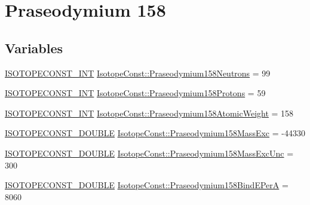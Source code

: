 \hypertarget{group___isotope_const-_praseodymium-_pr158}{}\section{Praseodymium 158}
\label{group___isotope_const-_praseodymium-_pr158}
\subsection*{Variables}
\begin{DoxyCompactItemize}
\item 
\mbox{\hyperlink{group___isotope_const-_macros_ga5f18360b3e99483a35c32d789e62621c}{I\+S\+O\+T\+O\+P\+E\+C\+O\+N\+S\+T\+\_\+\+I\+NT}} \mbox{\hyperlink{group___isotope_const-_praseodymium-_pr158_ga1643f275dcd857b2c5a684f2f9e751f9}{Isotope\+Const\+::\+Praseodymium158\+Neutrons}} = 99
\item 
\mbox{\hyperlink{group___isotope_const-_macros_ga5f18360b3e99483a35c32d789e62621c}{I\+S\+O\+T\+O\+P\+E\+C\+O\+N\+S\+T\+\_\+\+I\+NT}} \mbox{\hyperlink{group___isotope_const-_praseodymium-_pr158_gaf6fe8dbd43e0128d3000883e8921eedd}{Isotope\+Const\+::\+Praseodymium158\+Protons}} = 59
\item 
\mbox{\hyperlink{group___isotope_const-_macros_ga5f18360b3e99483a35c32d789e62621c}{I\+S\+O\+T\+O\+P\+E\+C\+O\+N\+S\+T\+\_\+\+I\+NT}} \mbox{\hyperlink{group___isotope_const-_praseodymium-_pr158_gad89468ec95b27f1875fb2e4d13703aa6}{Isotope\+Const\+::\+Praseodymium158\+Atomic\+Weight}} = 158
\item 
\mbox{\hyperlink{group___isotope_const-_macros_ga8f45a7272ce02c0b4c65c44636ed719a}{I\+S\+O\+T\+O\+P\+E\+C\+O\+N\+S\+T\+\_\+\+D\+O\+U\+B\+LE}} \mbox{\hyperlink{group___isotope_const-_praseodymium-_pr158_ga8a83a7607b4c80c02d9fededa6e7cf62}{Isotope\+Const\+::\+Praseodymium158\+Mass\+Exc}} = -\/44330
\item 
\mbox{\hyperlink{group___isotope_const-_macros_ga8f45a7272ce02c0b4c65c44636ed719a}{I\+S\+O\+T\+O\+P\+E\+C\+O\+N\+S\+T\+\_\+\+D\+O\+U\+B\+LE}} \mbox{\hyperlink{group___isotope_const-_praseodymium-_pr158_gafc1a418cbf7eb8d79c97c4029f903be5}{Isotope\+Const\+::\+Praseodymium158\+Mass\+Exc\+Unc}} = 300
\item 
\mbox{\hyperlink{group___isotope_const-_macros_ga8f45a7272ce02c0b4c65c44636ed719a}{I\+S\+O\+T\+O\+P\+E\+C\+O\+N\+S\+T\+\_\+\+D\+O\+U\+B\+LE}} \mbox{\hyperlink{group___isotope_const-_praseodymium-_pr158_ga3a7508f0f6b46cd64999b101e97328ec}{Isotope\+Const\+::\+Praseodymium158\+Bind\+E\+PerA}} = 8060

\end{DoxyCompactItemize}

